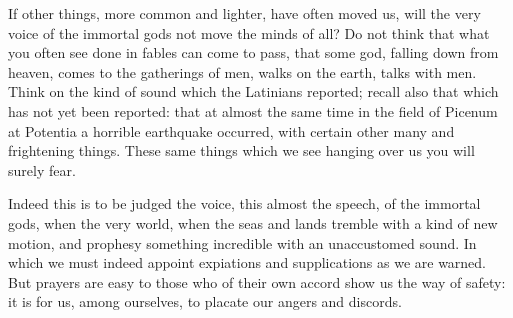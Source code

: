  If other things, more common and lighter, have often moved us, will the very voice of the immortal gods not move the minds of all? Do not think that what you often see done in fables can come to pass, that some god, falling down from heaven, comes to the gatherings of men, walks on the earth, talks with men. Think on the kind of sound which the Latinians reported; recall also that which has not yet been reported: that at almost the same time in the field of Picenum at Potentia a horrible earthquake occurred, with certain other many and frightening things. These same things which we see hanging over us you will surely fear.

 Indeed this is to be judged the voice, this almost the speech, of the immortal gods, when the very world, when the seas and lands tremble with a kind of new motion, and prophesy something incredible with an unaccustomed sound. In which we must indeed appoint expiations and supplications as we are warned. But prayers are easy to those who of their own accord show us the way of safety: it is for us, among ourselves, to placate our angers and discords.
